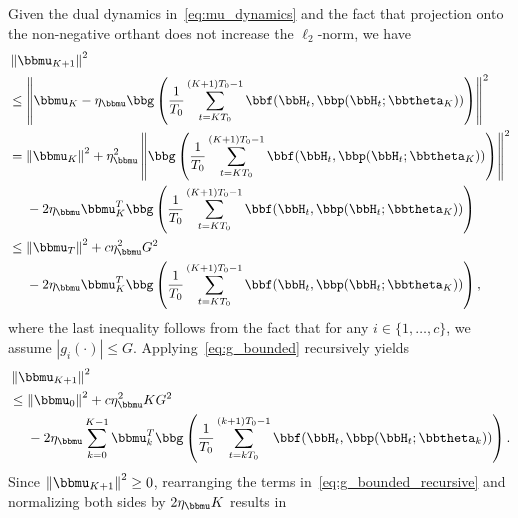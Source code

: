 Given the dual dynamics in~\eqref{eq:mu_dynamics} and the fact that projection onto the non-negative orthant does not increase the $\ell_2$-norm, we have
\begin{align}
&\left\|\bbmu_{K+1}\right\|^2\nonumber\\
&\leq \left\|\bbmu_K - \eta_{\bbmu} \bbg\left( \frac{1}{T_0} \sum_{t=KT_0}^{(K+1)T_0-1} \bbf(\bbH_{t}, \bbp(\bbH_{t};\bbtheta_K)) \right) \right\|^2\label{eq:norm_dual_update}\\
&=\left\|\bbmu_K \right\|^2 + \eta_{\bbmu}^2 \left\| \bbg\left( \frac{1}{T_0} \sum_{t=KT_0}^{(K+1)T_0-1} \bbf(\bbH_{t}, \bbp(\bbH_{t};\bbtheta_K)) \right)\right\|^2 \nonumber \\
&~\quad- 2\eta_{\bbmu}\bbmu_K^T \bbg\left( \frac{1}{T_0} \sum_{t=KT_0}^{(K+1)T_0-1} \bbf(\bbH_{t}, \bbp(\bbH_{t};\bbtheta_K)) \right)\label{eq:norm_dual_square_expansion}\\
&\leq\left\|\bbmu_T\right\|^2 + c\eta_{\bbmu}^2 G^2  \nonumber \\
&~\quad - 2\eta_{\bbmu}\bbmu_K^T \bbg\left( \frac{1}{T_0} \sum_{t=KT_0}^{(K+1)T_0-1} \bbf(\bbH_{t}, \bbp(\bbH_{t};\bbtheta_K)) \right),\label{eq:g_bounded}
\end{align}
where the last inequality follows from the fact that for any $i\in\{1,\dots,c\}$, we assume $|g_i\left(\cdot\right)|\leq G$. Applying~\eqref{eq:g_bounded} recursively yields
\begin{align}
&\left\|\bbmu_{K+1}\right\|^2 \nonumber\\
&\leq \left\|\bbmu_0\right\|^2 + c\eta_{\bbmu}^2 K G^2  \nonumber \\
&~\quad - 2\eta_{\bbmu} \sum_{k=0}^{K-1} \bbmu_k^T \bbg\left( \frac{1}{T_0} \sum_{t=kT_0}^{(k+1)T_0-1} \bbf(\bbH_{t}, \bbp(\bbH_{t};\bbtheta_k)) \right).\label{eq:g_bounded_recursive}
\end{align}
Since $\left\|\bbmu_{K+1}\right\|^2 \geq 0$, rearranging the terms in~\eqref{eq:g_bounded_recursive} and normalizing both sides by $2\eta_{\bbmu}K$ results in
